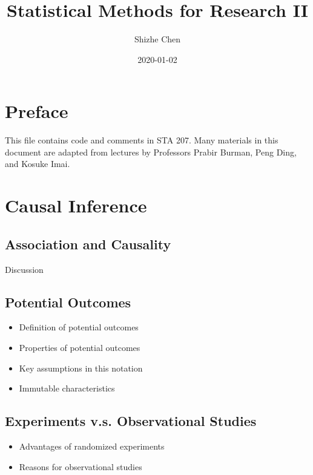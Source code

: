 \documentclass[12pt,]{book}
\title{Statistical Methods for Research II}
\author{Shizhe Chen}
\date{2020-01-02}
\providecommand{\tightlist}{%
  \setlength{\itemsep}{0pt}\setlength{\parskip}{0pt}}
\begin{document}
\maketitle

{
\setcounter{tocdepth}{1}
\tableofcontents
}
\chapter*{Preface}\label{pre}

This file contains code and comments in STA 207. Many materials in this
document are adapted from lectures by Professors Prabir Burman, Peng
Ding, and Kosuke Imai.

\chapter{Causal Inference}\label{ch:causal}

\section{Association and Causality}\label{association-and-causality}

Discussion

\section{Potential Outcomes}\label{potential-outcomes}

\begin{itemize}
\tightlist
\item
  Definition of potential outcomes
\item
  Properties of potential outcomes
\item
  Key assumptions in this notation
\item
  Immutable characteristics
\end{itemize}

\section{Experiments v.s. Observational
Studies}\label{experiments-v.s.-observational-studies}

\begin{itemize}
\tightlist
\item
  Advantages of randomized experiments
\item
  Reasons for observational studies
\end{itemize}
\end{document}
